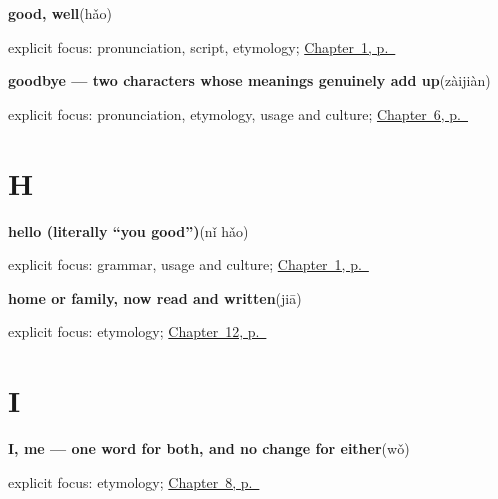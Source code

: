 \noindent\begin{minipage}[t]{\linewidth}
\raggedright
\textbf{good, well}\enspace\emph{}\enspace(hǎo)\par
\footnotesize explicit focus: pronunciation, script, etymology; \hyperref[ch:zh-nihao]{Chapter~1, p.~\pageref*{ch:zh-nihao}}
\end{minipage}\par\smallskip

\noindent\begin{minipage}[t]{\linewidth}
\raggedright
\textbf{goodbye — two characters whose meanings genuinely add up}\enspace\emph{}\enspace(zàijiàn)\par
\footnotesize explicit focus: pronunciation, etymology, usage and culture; \hyperref[ch:zh-zaijian]{Chapter~6, p.~\pageref*{ch:zh-zaijian}}
\end{minipage}\par\smallskip

\section*{H}

\noindent\begin{minipage}[t]{\linewidth}
\raggedright
\textbf{hello (literally \textquotedblleft{}you good\textquotedblright{})}\enspace\emph{}\enspace(nǐ hǎo)\par
\footnotesize explicit focus: grammar, usage and culture; \hyperref[ch:zh-nihao]{Chapter~1, p.~\pageref*{ch:zh-nihao}}
\end{minipage}\par\smallskip

\noindent\begin{minipage}[t]{\linewidth}
\raggedright
\textbf{home or family, now read and written}\enspace\emph{}\enspace(jiā)\par
\footnotesize explicit focus: etymology; \hyperref[ch:zh-family-six]{Chapter~12, p.~\pageref*{ch:zh-family-six}}
\end{minipage}\par\smallskip

\section*{I}

\noindent\begin{minipage}[t]{\linewidth}
\raggedright
\textbf{I, me — one word for both, and no change for either}\enspace\emph{}\enspace(wǒ)\par
\footnotesize explicit focus: etymology; \hyperref[ch:zh-mingzi]{Chapter~8, p.~\pageref*{ch:zh-mingzi}}
\end{minipage}\par\smallskip

